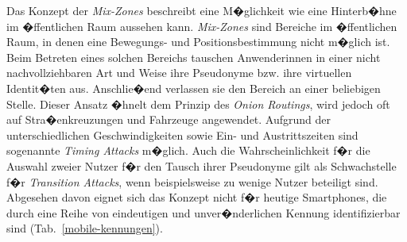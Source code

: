 Das Konzept der \textit{Mix-Zones} \cite{Palanisamy2014} beschreibt eine M�glichkeit wie eine Hinterb�hne im �ffentlichen Raum aussehen kann. \textit{Mix-Zones} sind Bereiche im �ffentlichen Raum, in denen eine Bewegungs- und Positionsbestimmung nicht m�glich ist. Beim Betreten eines solchen Bereichs tauschen Anwenderinnen in einer nicht nachvollziehbaren Art und Weise ihre Pseudonyme bzw. ihre virtuellen Identit�ten aus. Anschlie�end verlassen sie den Bereich an einer beliebigen Stelle. Dieser Ansatz �hnelt dem Prinzip des \textit{Onion Routings}, wird jedoch oft auf Stra�enkreuzungen und Fahrzeuge angewendet. Aufgrund der unterschiedlichen Geschwindigkeiten sowie Ein- und Austrittszeiten sind sogenannte \textit{Timing Attacks} m�glich. Auch die Wahrscheinlichkeit f�r die Auswahl zweier Nutzer f�r den Tausch ihrer Pseudonyme gilt als Schwachstelle f�r \textit{Transition Attacks}, wenn beispielsweise zu wenige Nutzer beteiligt sind. Abgesehen davon eignet sich das Konzept nicht f�r heutige Smartphones, die durch eine Reihe von eindeutigen und unver�nderlichen Kennung identifizierbar sind (Tab.~\ref{mobile-kennungen}).

